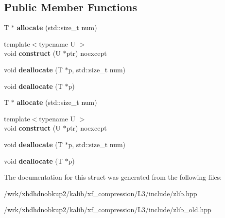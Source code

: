 \subsection*{Public Member Functions}
\begin{DoxyCompactItemize}
\item 
\hypertarget{structzlib__aligned__allocator_a7bb6564c8ff34ec174e22a82e3259318}{T $\ast$ {\bfseries allocate} (std\-::size\-\_\-t num)}\label{structzlib__aligned__allocator_a7bb6564c8ff34ec174e22a82e3259318}

\item 
\hypertarget{structzlib__aligned__allocator_a536bca0042d96f416eec564fedc24dcd}{{\footnotesize template$<$typename U $>$ }\\void {\bfseries construct} (U $\ast$ptr) noexcept}\label{structzlib__aligned__allocator_a536bca0042d96f416eec564fedc24dcd}

\item 
\hypertarget{structzlib__aligned__allocator_a2cc7874853131a3de9a8947075f6237b}{void {\bfseries deallocate} (T $\ast$p, std\-::size\-\_\-t num)}\label{structzlib__aligned__allocator_a2cc7874853131a3de9a8947075f6237b}

\item 
\hypertarget{structzlib__aligned__allocator_a193f6feac7c4efcaae2ed95dbb169d11}{void {\bfseries deallocate} (T $\ast$p)}\label{structzlib__aligned__allocator_a193f6feac7c4efcaae2ed95dbb169d11}

\item 
\hypertarget{structzlib__aligned__allocator_a7bb6564c8ff34ec174e22a82e3259318}{T $\ast$ {\bfseries allocate} (std\-::size\-\_\-t num)}\label{structzlib__aligned__allocator_a7bb6564c8ff34ec174e22a82e3259318}

\item 
\hypertarget{structzlib__aligned__allocator_a536bca0042d96f416eec564fedc24dcd}{{\footnotesize template$<$typename U $>$ }\\void {\bfseries construct} (U $\ast$ptr) noexcept}\label{structzlib__aligned__allocator_a536bca0042d96f416eec564fedc24dcd}

\item 
\hypertarget{structzlib__aligned__allocator_a2cc7874853131a3de9a8947075f6237b}{void {\bfseries deallocate} (T $\ast$p, std\-::size\-\_\-t num)}\label{structzlib__aligned__allocator_a2cc7874853131a3de9a8947075f6237b}

\item 
\hypertarget{structzlib__aligned__allocator_a193f6feac7c4efcaae2ed95dbb169d11}{void {\bfseries deallocate} (T $\ast$p)}\label{structzlib__aligned__allocator_a193f6feac7c4efcaae2ed95dbb169d11}

\end{DoxyCompactItemize}


The documentation for this struct was generated from the following files\-:\begin{DoxyCompactItemize}
\item 
/wrk/xhdhdnobkup2/kalib/xf\-\_\-compression/\-L3/include/zlib.\-hpp\item 
/wrk/xhdhdnobkup2/kalib/xf\-\_\-compression/\-L3/include/zlib\-\_\-old.\-hpp\end{DoxyCompactItemize}
